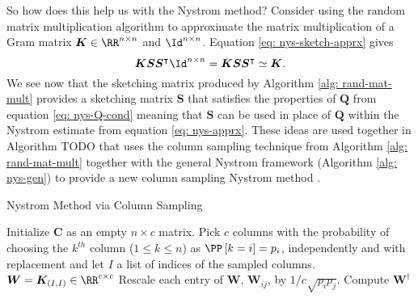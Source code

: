 So how does this help us with the Nystrom method? Consider using the random matrix multiplication algorithm to approximate the matrix multiplication of a Gram matrix $\bm{K} \in \RR^{n \times n}$ and $\Id^{n \times n}$. Equation \ref{eq: nys-sketch-apprx} gives
\begin{equation*}
    \bm{K} \bm{S} \bm{S}^{\intercal} \Id^{n \times n} = \bm{K} \bm{S} \bm{S}^{\intercal} \simeq \bm{K}.
\end{equation*}
We see now that the sketching matrix produced by Algorithm \ref{alg: rand-mat-mult} provides a sketching matrix $\bm{S}$ that satisfies the properties of $\bm{Q}$ from equation \ref{eq: nys-Q-cond} meaning that $\bm{S}$ can be used in place of $\bm{Q}$ within the Nystrom estimate from equation \ref{eq: nys-apprx}. These ideas are used together in Algorithm TODO that uses the column sampling technique from Algorithm \ref{alg: rand-mat-mult} together with the general Nystrom framework (Algorithm \ref{alg: nys-gen}) to provide a new column sampling Nystrom method \cite{JMLR:v6:drineas05a,DBLP:journals/corr/abs-1303-1849}.
{\centering
\begin{minipage}{.85\linewidth}
    \begin{algorithm}[H]
        \caption{Nystrom Method via Column Sampling}
        \label{alg: rand-mat-mult}
        \SetAlgoLined
        \DontPrintSemicolon

        \BlankLine
        Initialize $\bm{C}$ as an empty $n \times c$ matrix.\;
        Pick $c$ columns with the probability of choosing the $k^{th}$ column ($1 \leq k \leq n$) as $\PP \left[ k = i \right] = p_i$, independently and with replacement and let $I$ a list of indices of the sampled columns.\;
        $\bm{W} = \bm{K}_{(I,I)} \in \RR^{c \times c}$\;
        Rescale each entry of $\bm{W}$, $\bm{W}_{ij}$, by $1 / c \sqrt{p_i p_j}$.\;
        Compute $\bm{W}^{\dagger}$\;
        \BlankLine
    \end{algorithm}
\end{minipage}
\par}

